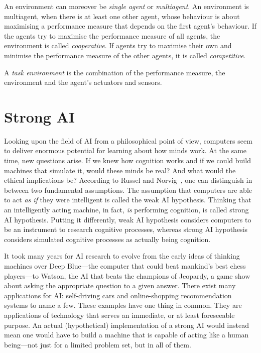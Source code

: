 An environment can moreover be \emph{single agent} or \emph{multiagent}. An environment is multiagent, when there is at least one other agent, whose behaviour is about maximising a performance measure that depends on the first agent's behaviour. If the agents try to maximise the performance measure of all agents, the environment is called \emph{cooperative}. If agents try to maximise their own and minimise the performance measure of the other agents, it is called \emph{competitive}.

A \emph{task environment} is the combination of the performance measure, the environment and the agent's actuators and sensors.

    \section{Strong AI}

Looking upon the field of AI from a philosophical point of view, computers seem to deliver enormous potential for learning about how minds work. At the same time, new questions arise. If we knew how cognition works and if we could build machines that simulate it, would these minds be real? And what would the ethical implications be? According to Russel and Norvig~\cite{russell2009artificial}, one can distinguish in between two fundamental assumptions. The assumption that computers are able to act \emph{as if} they were intelligent is called the weak AI hypothesis. Thinking that an intelligently acting machine, in fact, \emph{is} performing cognition, is called strong AI hypothesis. Putting it differently, weak AI hypothesis considers computers to be an instrument to research cognitive processes, whereas strong AI hypothesis considers simulated cognitive processes as actually being cognition.  

It took many years for AI research to evolve from the early ideas of thinking machines over Deep Blue---the computer that could beat mankind's best chess players---to Watson, the AI that beats the champions of Jeopardy, a game show about asking the appropriate question to a given answer. There exist many applications for AI: self-driving cars and online-shopping recommendation systems to name a few. These examples have one thing in common. They are applications of technology that serves an immediate, or at least foreseeable purpose. An actual (hypothetical) implementation of a strong AI would instead mean one would have to build a machine that is capable of acting like a human being---not just for a limited problem set, but in all of them. 

